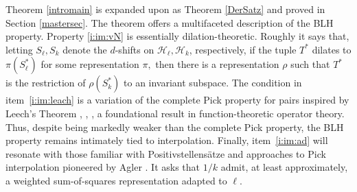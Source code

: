 \documentclass[a4paper,reqno,index]{amsart}
\numberwithin{equation}{section}
\theoremstyle{definition}
\begin{document}
\noindent Theorem \ref{intromain} is expanded upon as Theorem \ref{DerSatz} and proved in Section \ref{mastersec}.
The theorem offers a multifaceted description of the BLH property. Property \ref{i:im:vN} is essentially dilation-theoretic. Roughly it says that, letting $S_{\ell}, S_{k}$ denote the $d$-shifts on $\mathcal{H}_{\ell}, \mathcal{H}_k$, respectively, if the tuple $T^*$  dilates to $\pi(S_\ell^*)$  for some representation $\pi,$
then there is a representation $\rho$ such that  $T^*$ is the restriction of $\rho(S_k^*)$ to an invariant subspace. 
The condition in item~\ref{i:im:leach} is a variation of the complete Pick property for pairs \cite{Shimorin} inspired
by Leech's Theorem \cite{Leechoriginal}, \cite[Theorem 8.57]{Pickbook}, \cite{RandR},  a foundational result in function-theoretic operator theory.   Thus, despite being  markedly weaker than the complete Pick property, the BLH property remains intimately tied to interpolation. 
Finally, item~\ref{i:im:ad}   will resonate with those familiar with Positivstellensätze and
approaches to Pick interpolation pioneered by Agler \cite{Hellinger}. It asks that $1/k$ admit, at least approximately,
a weighted sum-of-squares representation adapted to $\ell.$

 
\end{document}
